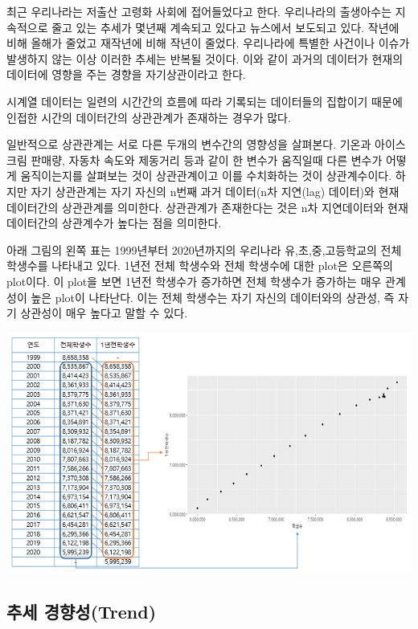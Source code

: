 \documentclass[
]{book}
\begin{document}
최근 우리나라는 저출산 고령화 사회에 접어들었다고 한다. 우리나라의 출생아수는 지속적으로 줄고 있는 추세가 몇년째 계속되고 있다고 뉴스에서 보도되고 있다. 작년에 비해 올해가 줄었고 재작년에 비해 작년이 줄었다. 우리나라에 특별한 사건이나 이슈가 발생하지 않는 이상 이러한 추세는 반복될 것이다. 이와 같이 과거의 데이터가 현재의 데이터에 영향을 주는 경향을 자기상관이라고 한다.

시계열 데이터는 일련의 시간간의 흐름에 따라 기록되는 데이터들의 집합이기 때문에 인접한 시간의 데이터간의 상관관계가 존재하는 경우가 많다.

일반적으로 상관관계는 서로 다른 두개의 변수간의 영향성을 살펴본다. 기온과 아이스크림 판매량, 자동차 속도와 제동거리 등과 같이 한 변수가 움직일때 다른 변수가 어떻게 움직이는지를 살펴보는 것이 상관관계이고 이를 수치화하는 것이 상관계수이다. 하지만 자기 상관관계는 자기 자신의 n번째 과거 데이터(n차 지연(lag) 데이터)와 현재 데이터간의 상관관계를 의미한다. 상관관계가 존재한다는 것은 n차 지연데이터와 현재 데이터간의 상관계수가 높다는 점을 의미한다.

아래 그림의 왼쪽 표는 1999년부터 2020년까지의 우리나라 유,초,중,고등학교의 전체 학생수를 나타내고 있다. 1년전 전체 학생수와 전체 학생수에 대한 plot은 오른쪽의 plot이다. 이 plot을 보면 1년전 학생수가 증가하면 전체 학생수가 증가하는 매우 관계성이 높은 plot이 나타난다. 이는 전체 학생수는 자기 자신의 데이터와의 상관성, 즉 자기 상관성이 매우 높다고 말할 수 있다.

\includegraphics{autocorelation.png}

\hypertarget{uxcd94uxc138-uxacbduxd5a5uxc131trend}{%
\subsection{추세 경향성(Trend)}\label{uxcd94uxc138-uxacbduxd5a5uxc131trend}}
\end{document}
